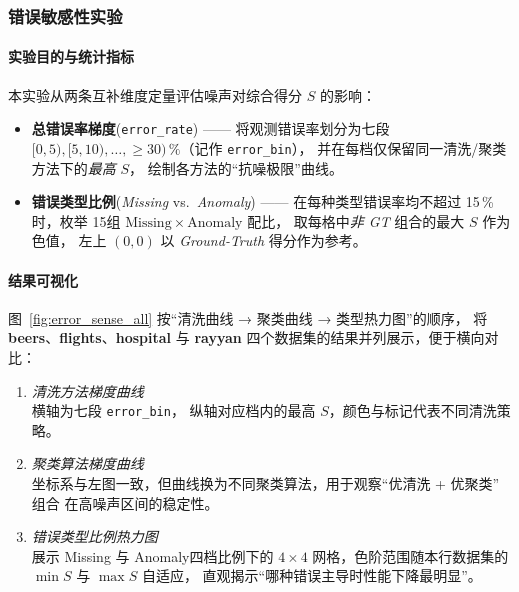 \documentclass[10pt]{article} %
\numberwithin{equation}{section}
\begin{document}
\subsubsection{\textcolor[rgb]{0.00,0.07,1.00}{错误敏感性实验}}
\label{sec:error_sense_exp}

\paragraph{实验目的与统计指标}
本实验从两条互补维度定量评估噪声对综合得分 \(S\) 的影响：
\begin{itemize}[leftmargin=1.9em]
  \item \textbf{总错误率梯度}\;(\texttt{error\_rate}) ——  
        将观测错误率划分为七段
        \(\![0,5),[5,10),\dots,\ge{}30)\,\%\)（记作 \texttt{error\_bin}），
        并在每档仅保留同一清洗\;/\;聚类方法下的\emph{最高} \(S\)，
        绘制各方法的“抗噪极限”曲线。
  \item \textbf{错误类型比例}\;(\textit{Missing} vs.\ \textit{Anomaly}) ——  
        在每种类型错误率均不超过 15 \% 时，枚举
        15组 \(\mathrm{Missing}\times\mathrm{Anomaly}\) 配比，
        取每格中\emph{非 GT} 组合的最大 \(S\) 作为色值，
        左上 \((0,0)\) 以 \textit{Ground-Truth} 得分作为参考。
\end{itemize}

\paragraph{结果可视化}
图~\ref{fig:error_sense_all} 按“清洗曲线 → 聚类曲线 → 类型热力图”的顺序，
将 \textbf{beers}、\textbf{flights}、\textbf{hospital} 与 \textbf{rayyan}
四个数据集的结果并列展示，便于横向对比：
\begin{enumerate}[label=\arabic*) ,leftmargin=1.2em]
  \item \emph{清洗方法梯度曲线} \\
        横轴为七段 \texttt{error\_bin}，
        纵轴对应档内的最高 \(S\)，颜色与标记代表不同清洗策略。
  \item \emph{聚类算法梯度曲线} \\
        坐标系与左图一致，但曲线换为不同聚类算法，用于观察“优清洗 + 优聚类” 组合
        在高噪声区间的稳定性。
  \item \emph{错误类型比例热力图} \\
        展示 Missing 与 Anomaly四档比例下的 \(4\times4\) 网格，色阶范围随本行数据集的 \(\min S\) 与 \(\max S\) 自适应，
        直观揭示“哪种错误主导时性能下降最明显”。
\end{enumerate}
\end{document}
